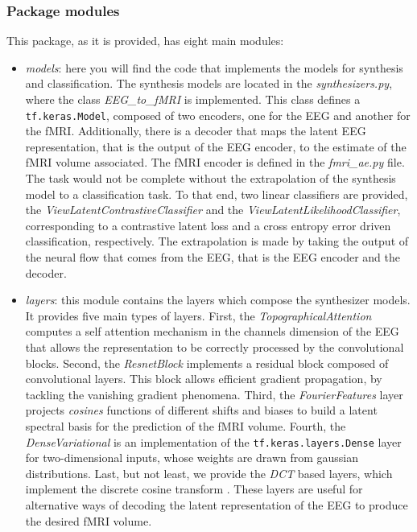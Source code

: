 \subsubsection{Package modules}\label{section:modules}

This package, as it is provided, has eight main modules:
\begin{itemize}
    \item \textit{models}: here you will find the code that implements the models for synthesis and classification. The synthesis models are located in the \textit{synthesizers.py}, where the class \textit{EEG\_to\_fMRI} is implemented. This class defines a \texttt{tf.keras.Model}, composed of two encoders, one for the EEG and another for the fMRI. Additionally, there is a decoder that maps the latent EEG representation, that is the output of the EEG encoder, to the estimate of the fMRI volume associated. The fMRI encoder is defined in the \textit{fmri\_ae.py} file. The task would not be complete without the extrapolation of the synthesis model to a classification task. To that end, two linear classifiers are provided, the \textit{ViewLatentContrastiveClassifier} and the \textit{ViewLatentLikelihoodClassifier}, corresponding to a contrastive latent loss and a cross entropy error driven classification, respectively. The extrapolation is made by taking the output of the neural flow that comes from the EEG, that is the EEG encoder and the decoder.
    \item \textit{layers}: this module contains the layers which compose the synthesizer models. It provides five main types of layers. First, the \textit{TopographicalAttention} computes a self attention mechanism in the channels dimension of the EEG \cite{calhas2022eeg} that allows the representation to be correctly processed by the convolutional blocks. Second, the \textit{ResnetBlock} \cite{he2016deep} implements a residual block composed of convolutional layers. This block allows efficient gradient propagation, by tackling the vanishing gradient phenomena. Third, the \textit{FourierFeatures} layer projects \textit{cosines} functions of different shifts and biases to build a latent spectral basis for the prediction of the fMRI volume. Fourth, the \textit{DenseVariational} is an implementation of the \texttt{tf.keras.layers.Dense} layer for two-dimensional inputs, whose weights are drawn from gaussian distributions. Last, but not least, we provide the \textit{DCT} based layers, which implement the discrete cosine transform \cite{ahmed1974discrete}. These layers are useful for alternative ways of decoding the latent representation of the EEG to produce the desired fMRI volume.

\end{itemize}
